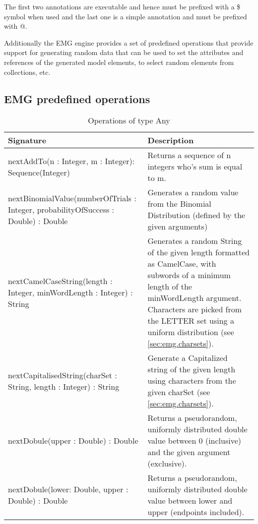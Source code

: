 The first two annotations are executable and hence must be prefixed with a \$ symbol when used and the last one is a simple annotation and must be prefixed with @.

Additionally the EMG engine provides a set of predefined operations that provide support for generating random data that can be used to set the attributes and references of the generated model elements, to select random elements from collections, etc.

\subsection{EMG predefined  operations}
\begin{longtabu} {|p{6.5cm}|X|}
	\caption{Operations of type Any}
	\label{tab:EmgOperations}\\
	\hline
	\textbf{Signature} & \textbf{Description} \\\hline
	
	nextAddTo(n : Integer, m : Integer): Sequence(Integer)  & Returns a sequence of n integers who's sum is equal to m. \\\hline
	
	nextBinomialValue(numberOfTrials : Integer, probabilityOfSuccess : Double) : Double & Generates a random value from the Binomial Distribution (defined by the given arguments) \\\hline

	nextCamelCaseString(length : Integer, minWordLength : Integer) : String & Generates a random String of the given length formatted as CamelCase, with subwords of a minimum length of the minWordLength argument. Characters are picked from the LETTER set using a uniform distribution (see \ref{sec:emg.charsets}).\\\hline
	
	nextCapitalisedString(charSet : String, length : Integer) : String & Generate a Capitalized string of the given length using characters from the given charSet (see \ref{sec:emg.charsets}).\\\hline
	
	nextDobule(upper : Double) : Double & Returns a pseudorandom, uniformly distributed double value between 0 (inclusive) and the given argument (exclusive).\\\hline
	
	nextDobule(lower: Double, upper : Double) : Double & Returns a pseudorandom, uniformly distributed double value between lower and upper (endpoints included). \\\hline
	

\end{longtabu}
